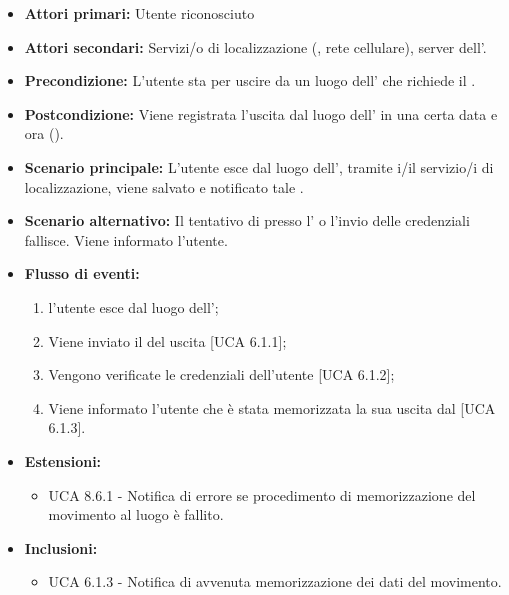 \begin{itemize}
	\item \textbf{Attori primari:} Utente riconosciuto
	\item \textbf{Attori secondari:} Servizi/o di localizzazione (, rete cellulare), server  dell'.
	\item \textbf{Precondizione:} L'utente sta per uscire da un luogo dell' che richiede il .
	\item \textbf{Postcondizione:} Viene registrata l'uscita dal luogo dell' in una certa data e ora ().
	\item \textbf{Scenario principale:} L'utente esce dal luogo dell', tramite i/il servizio/i di localizzazione, viene salvato e notificato tale . 
	\item \textbf{Scenario alternativo:} Il tentativo di  presso l' o l'invio delle credenziali fallisce. Viene informato l'utente.
		\item \textbf{Flusso di eventi:}
	\begin{enumerate}
		\item l'utente esce dal luogo dell';
		\item Viene inviato il  del uscita [UCA 6.1.1];
		\item Vengono verificate le credenziali dell'utente [UCA 6.1.2];
		\item Viene informato l'utente che è stata memorizzata la sua uscita dal  [UCA 6.1.3].
	\end{enumerate}
	\item \textbf{Estensioni:}
		\begin{itemize}
		\item UCA 8.6.1 - Notifica di errore se procedimento di memorizzazione del movimento al luogo è fallito.
	\end{itemize}
	\item \textbf{Inclusioni:}
	\begin{itemize}
		\item UCA 6.1.3 - Notifica di avvenuta memorizzazione dei dati del movimento.
	\end{itemize}
\end{itemize}

